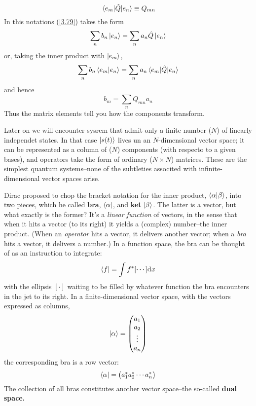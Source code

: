 \begin{equation}\label{3.81}
	\mel{e_m}{\hat{Q}}{e_n}\equiv Q_{mn}
\end{equation}
In this notations (\ref{3.79}) takes the form
\begin{equation}\label{3.82}
	\sum_nb_n\ket{e_n}=\sum_na_n\hat{Q}\ket{e_n}
\end{equation}
or, taking the inner product with $\ket{e_m}$,
\begin{equation}\label{3.83}
	\sum_n b_n\braket{e_m}{e_n}=\sum_na_n\mel{e_m}{\hat{Q}}{e_n}
\end{equation}
and hence
\begin{equation}\label{3.84}
	b_m=\sum_nQ_{mn}a_n
\end{equation}
Thus the matrix elements tell you how the components transform. 

Later on we will encounter sysrem that admit only a finite number ($N$) of linearly independet states. In that case $\ket{s(t)}$ lives un an $N$-dimensional vector space; it can be represented as a column of ($N$) components (with respecto to a given bases), and operators take the form of ordinary ($N\times N$) matrices. These are the simplest quantum systems--none of the subtleties associted with infinite-dimensional vector spaces arise. 

Dirac proposed to chop the bracket notation for the inner product, $\braket{\alpha}{\beta}$, into two pieces, which he called \textbf{bra}, $\bra{\alpha}$, and \textbf{ket} $\ket{\beta}$. The latter is a vector, but what exactly is the former? It's a \textit{linear function} of vectors, in the sense that when it hits a vector (to its right) it yields a (complex) number--the inner product. (When an \textit{operator} hits a vector, it delivers another vector; when a \textit{bra} hits a vector, it delivers a number.) In a function space, the bra can be thought of as an instruction to integrate: $$\bra{f}=\int f^*[\cdots]\dd x$$ with the ellipsis $[\cdot]$ waiting to be filled by whatever function the bra encounters in the jet to its right. In a finite-dimensional vector space, with the vectors expressed as columns,
\begin{equation}\label{3.87}
	\ket{\alpha}=\mqty(a_1\\a_2\\\vdots\\ a_n)
\end{equation}
the corresponding bra is a row vector:
\begin{equation}\label{3.88}
	\bra{\alpha}=\mqty(a_1^* a_2^*\cdots a_n^*)
\end{equation}
The collection of all bras constitutes another vector space--the so-called \textbf{dual space.}

